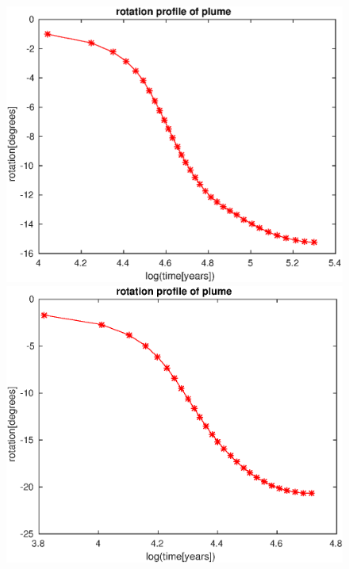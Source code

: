 \documentclass[12pt]{scrreprt}
\begin{document}
\begin{figure}[!ht]
	\begin{minipage}[t]{1.0\textwidth}
		\begin{minipage}[t]{0.5\textwidth}		
		\includegraphics[width=1.0\textwidth]{./Snapshots/ref/Subductionzonewithblobposrefslab20s2e7s2e7r20rotation.eps}
		\end{minipage}
		\begin{minipage}[t]{0.5\textwidth}
		\includegraphics[width=1.0\textwidth]{./Snapshots/ref/Subductionzonewithblobposrefslab30s2e7s2e7r20rotation.eps}

\end{minipage}
\end{minipage}
\end{figure}
\end{document}
